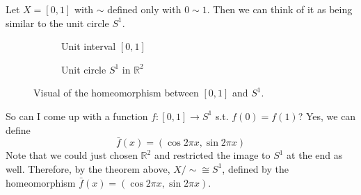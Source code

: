     \begin{example}[1-Sphere]
      Let $X = [0, 1]$ with $\sim$ defined only with $0 \sim 1$. Then we can think of it as being similar to the unit circle $S^1$. 

      \begin{figure}[H]
        \centering
        \begin{subfigure}[b]{0.48\textwidth}
          \centering
          \caption{Unit interval $[0, 1]$}
          \label{fig:unit-interval}
        \end{subfigure}
        \hfill 
        \begin{subfigure}[b]{0.48\textwidth}
          \centering
          \caption{Unit circle $S^1$ in $\mathbb{R}^2$}
          \label{fig:unit-circle}
        \end{subfigure}
        \caption{Visual of the homeomorphism between $[0, 1]$ and $S^1$.}
        \label{fig:comparison}
      \end{figure}

      So can I come up with a function $f: [0, 1] \rightarrow S^1$ s.t. $f(0) = f(1)$? Yes, we can define 
      \begin{equation}
        \bar{f}(x) = (\cos{2 \pi x}, \sin{2\pi x})
      \end{equation}
      Note that we could just chosen $\mathbb{R}^2$ and restricted the image to $S^1$ at the end as well. Therefore, by the theorem above, $X/\sim \cong S^1$, defined by the homeomorphism $\bar{f}(x) = (\cos{2 \pi x}, \sin{2\pi x})$.  
    \end{example}

